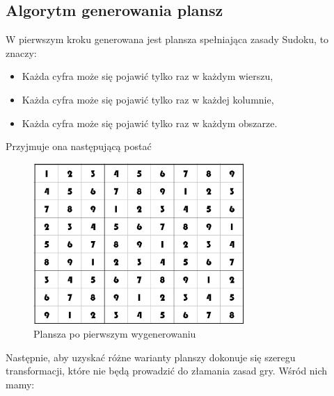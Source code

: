 \documentclass[a4paper, 11pt]{article}
\begin{document}
\subsection{Algorytm generowania plansz}
W pierwszym kroku generowana jest plansza spełniająca zasady Sudoku, to znaczy:
\begin{itemize}
	\item Każda cyfra może się pojawić tylko raz w każdym wierszu,
	\item Każda cyfra może się pojawić tylko raz w każdej kolumnie,
	\item Każda cyfra może się pojawić tylko raz w każdym obszarze.
\end{itemize}
Przyjmuje ona następującą postać
\begin{figure}[H]
	\centering
	\includegraphics[width=8cm]{zrzuty/plansza.png}
	\caption{Plansza po pierwszym wygenerowaniu}
	\label{fig:first_gen_board}
\end{figure}
Następnie, aby uzyskać różne warianty planszy dokonuje się szeregu transformacji, które nie będą prowadzić do złamania zasad gry. Wśród nich mamy:
\end{document}
